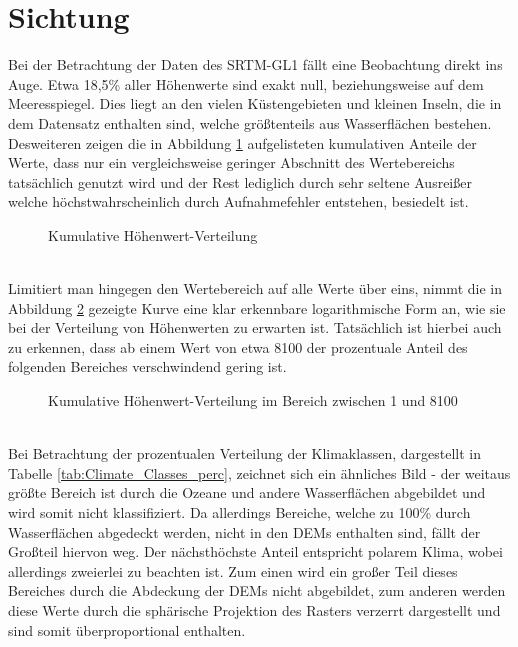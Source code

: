\section{Sichtung}

Bei der Betrachtung der Daten des SRTM-GL1 fällt eine Beobachtung direkt ins Auge. Etwa 18,5\% aller Höhenwerte sind exakt null, beziehungsweise auf dem Meeresspiegel. Dies liegt an den vielen Küstengebieten und kleinen Inseln, die in dem Datensatz enthalten sind, welche größtenteils aus Wasserflächen bestehen. Desweiteren zeigen die in Abbildung \ref{fig:dem_cum_hist_1} aufgelisteten kumulativen Anteile der Werte, dass nur ein vergleichsweise geringer Abschnitt des Wertebereichs tatsächlich genutzt wird und der Rest lediglich durch sehr seltene Ausreißer welche höchstwahrscheinlich durch Aufnahmefehler entstehen, besiedelt ist. 
\begin{figure}[htbp]
    \centering
    \caption{Kumulative Höhenwert-Verteilung}
    \label{fig:dem_cum_hist_1}
\end{figure} \\
Limitiert man hingegen den Wertebereich auf alle Werte über eins, nimmt die in Abbildung \ref{fig:dem_cum_hist_2} gezeigte Kurve eine klar erkennbare logarithmische Form an, wie sie bei der Verteilung von Höhenwerten zu erwarten ist. Tatsächlich ist hierbei auch zu erkennen, dass ab einem Wert von etwa 8100 der prozentuale Anteil des folgenden Bereiches verschwindend gering ist.
\begin{figure}[htbp]
    \centering
    \caption{Kumulative Höhenwert-Verteilung im Bereich zwischen 1 und 8100}
    \label{fig:dem_cum_hist_2}
\end{figure} \\
Bei Betrachtung der prozentualen Verteilung der Klimaklassen, dargestellt in Tabelle \ref{tab:Climate_Classes_perc}, zeichnet sich ein ähnliches Bild - der weitaus größte Bereich ist durch die Ozeane und andere Wasserflächen abgebildet und wird somit nicht klassifiziert. Da allerdings Bereiche, welche zu 100\% durch Wasserflächen abgedeckt werden, nicht in den \ac{DEM}s enthalten sind, fällt der Großteil hiervon weg. Der nächsthöchste Anteil entspricht polarem Klima, wobei allerdings zweierlei zu beachten ist. Zum einen wird ein großer Teil dieses Bereiches durch die Abdeckung der \ac{DEM}s nicht abgebildet, zum anderen werden diese Werte durch die sphärische Projektion des Rasters verzerrt dargestellt und sind somit überproportional enthalten.
